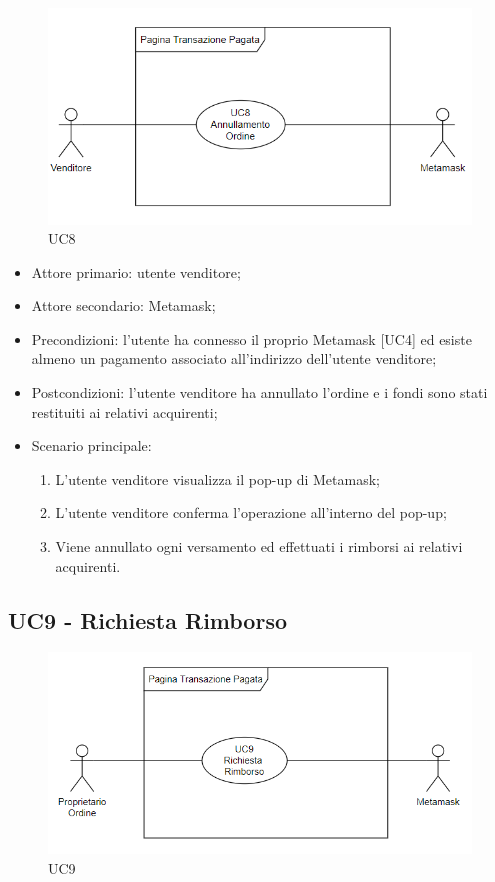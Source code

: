 \begin{figure}[H]
    \centering
    \includegraphics[scale=0.8]{immagini/UC8.png}
    \caption{UC8}
\end{figure}

\begin{itemize}
    \item Attore primario: utente venditore;
    \item Attore secondario: Metamask\glo{};
    \item Precondizioni: l'utente ha connesso il proprio Metamask\glo{} [UC4] ed esiste almeno un pagamento associato all'indirizzo dell'utente venditore;
    \item Postcondizioni: l'utente venditore ha annullato l'ordine e i fondi sono stati restituiti ai relativi acquirenti;
    \item Scenario principale:
          \begin{enumerate}
              \item L'utente venditore visualizza il pop-up di Metamask\glo{};
              \item L'utente venditore conferma l'operazione all'interno del pop-up;
              \item Viene annullato ogni versamento ed effettuati i rimborsi ai relativi acquirenti.
          \end{enumerate}
\end{itemize}

\subsection{UC9 - Richiesta Rimborso}

\begin{figure}[H]
    \centering
    \includegraphics[scale=0.8]{immagini/UC9.png}
    \caption{UC9}
\end{figure}

